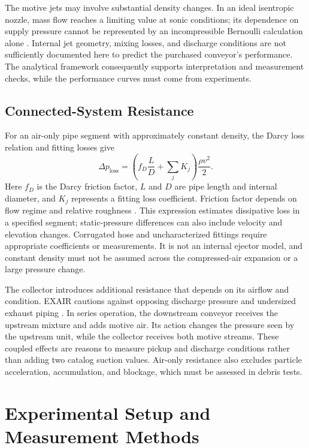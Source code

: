 The motive jets may involve substantial density changes. In an ideal isentropic nozzle, mass flow reaches a limiting value at sonic conditions; its dependence on supply pressure cannot be represented by an incompressible Bernoulli calculation alone \citep{nasaMassFlowChoking}. Internal jet geometry, mixing losses, and discharge conditions are not sufficiently documented here to predict the purchased conveyor's performance. The analytical framework consequently supports interpretation and measurement checks, while the performance curves must come from experiments.

\subsection{Connected-System Resistance}
For an air-only pipe segment with approximately constant density, the Darcy loss relation and fitting losses give
\begin{equation}
 \Delta p_{\mathrm{loss}}=
 \left(f_D\frac{L}{D}+\sum_j K_j\right)\frac{\rho v^2}{2}.
 \label{eq:vacuum-line-loss}
\end{equation}
Here $f_D$ is the Darcy friction factor, $L$ and $D$ are pipe length and internal diameter, and $K_j$ represents a fitting loss coefficient. Friction factor depends on flow regime and relative roughness \citep{doe1992FluidFlow}. This expression estimates dissipative loss in a specified segment; static-pressure differences can also include velocity and elevation changes. Corrugated hose and uncharacterized fittings require appropriate coefficients or measurements. It is not an internal ejector model, and constant density must not be assumed across the compressed-air expansion or a large pressure change.

The collector introduces additional resistance that depends on its airflow and condition. EXAIR cautions against opposing discharge pressure and undersized exhaust piping \citep{evans2013LineVacBackPressure}. In series operation, the downstream conveyor receives the upstream mixture and adds motive air. Its action changes the pressure seen by the upstream unit, while the collector receives both motive streams. These coupled effects are reasons to measure pickup and discharge conditions rather than adding two catalog suction values. Air-only resistance also excludes particle acceleration, accumulation, and blockage, which must be assessed in debris tests.

\section{Experimental Setup and Measurement Methods}
\label{sec:vacuum-measurements}

